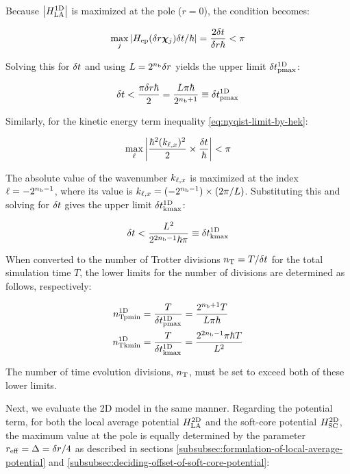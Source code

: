 \documentclass[aip-draft.tex]{subfiles}
\begin{document}
Because ${\left| H_{\mathrm{LA}}^{\mathrm{1D}} \right|}$ is maximized at the pole ($r=0$), the condition becomes:

\begin{equation}
\max_{j}{\left| H_{\mathrm{ep}}(\delta r\bm{\chi}_{j})\delta t/\hbar \right|} = \frac{2\delta t}{\delta r\hbar}<\pi
\end{equation}

Solving this for $\delta t$ and using $L=2^{n_{\mathrm{b}}}\delta r$ yields the upper limit $\delta t_{\mathrm{pmax}}^{\mathrm{1D}}$:

\begin{equation}
\delta t < \frac{\pi\delta r\hbar}{2}=\frac{L\pi\hbar}{2^{n_{\mathrm{b}}+1}}\equiv\delta t_{\mathrm{pmax}}^{\mathrm{1D}}
 \label{eq:nyqist-limit-by-hep-final}
\end{equation}

Similarly, for the kinetic energy term inequality \eqref{eq:nyqist-limit-by-hek}:

\begin{equation}
\max_{\ell}{\left| \frac{\hbar^2(k_{\ell,x})^2}{2}\times\frac{\delta t}{\hbar} \right|} < \pi
\label{eq:nyqist-limit-by-hek-maximum}
\end{equation}

The absolute value of the wavenumber $k_{\ell,x}$ is maximized at the index $\ell =
-2^{n_{\mathrm{b}}-1}$, where its value is $k_{\ell,x} = (-2^{n_{\mathrm{b}}-1})\times(2\pi/L)$.
Substituting this and solving for $\delta t$ gives the upper limit
$\delta t_{\mathrm{kmax}}^{\mathrm{1D}}$:

\begin{equation}
\delta t < \frac{L^2}{2^{2n_{\mathrm{b}}-1}\hbar\pi}\equiv\delta t_{\mathrm{kmax}}^{\mathrm{1D}}
 \label{eq:nyqist-limit-by-hek-final}
\end{equation}

When converted to the number of Trotter divisions $n_{\mathrm{T}} = T/\delta t$ for the
total simulation time $T$, the lower limits for the number of divisions are
determined as follows, respectively:

\begin{align}
    n_{\mathrm{Tpmin}}^{\mathrm{1D}} &= \frac{T}{\delta t_{\mathrm{pmax}}^{\mathrm{1D}}}=\frac{2^{n_{\mathrm{b}}+1}T}{L\pi\hbar}
    \label{eq:nT-pmin-definition}\\
    n_{\mathrm{Tkmin}}^{\mathrm{1D}} &= \frac{T}{\delta t_{\mathrm{kmax}}^{\mathrm{1D}}}=\frac{2^{2n_{\mathrm{b}}-1}\pi\hbar T}{L^2}
    \label{eq:nT-kmin-definition}
\end{align}

The number of time evolution divisions, $n_{\mathrm{T}}$, must be set to exceed both of these
lower limits.

Next, we evaluate the 2D model in the same manner. Regarding the potential term,
for both the local average potential $H_{\mathrm{LA}}^{\mathrm{2D}}$ and the soft-core potential
$H_{\mathrm{SC}}^{\mathrm{2D}}$, the maximum value at the pole is equally determined by the parameter
$r_{\mathrm{eff}}=\Delta=\delta r/4$ as described in sections
\ref{subsubsec:formulation-of-local-average-potential} and
\ref{subsubsec:deciding-offset-of-soft-core-potential}:
\end{document}
